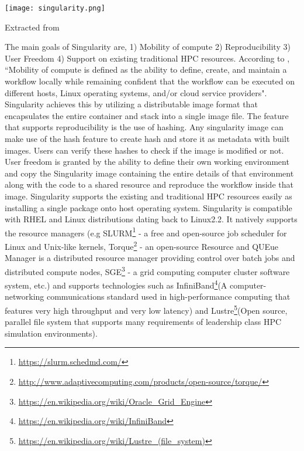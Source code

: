 \begin{center}
\texttt{[image: singularity.png]}
\label{fig:singularity_workflow}
\caption*{Extracted from \cite{10.1371/journal.pone.0177459}}
\end{center}

The main goals of Singularity are, 1) Mobility of compute 2) Reproducibility 3) User Freedom 4) Support on existing traditional HPC resources. According to \cite{10.1371/journal.pone.0177459}, ``Mobility of compute is defined as the ability to define, create, and maintain a workflow locally while remaining confident that the workflow can be executed on different hosts, Linux operating systems, and/or cloud service providers". Singularity achieves this by utilizing a distributable image format that encapsulates the entire container and stack into a single image file. The feature that supports reproducibility is the use of hashing. Any singularity image can make use of the hash feature to create hash and store it as metadata with built images. Users can verify these hashes to check if the image is modified or not. User freedom is granted by the ability to define their own working environment and copy the Singularity image containing the entire details of that environment along with the code to a shared resource and reproduce the workflow inside that image. Singularity supports the existing and traditional HPC resources easily as installing a single package onto host operating system. Singularity is compatible with RHEL and Linux distributions dating back to Linux2.2. It natively supports the resource managers (e.g SLURM\footnote{\url{https://slurm.schedmd.com/}} - a free and open-source job scheduler for Linux and Unix-like kernels, Torque\footnote{\url{http://www.adaptivecomputing.com/products/open-source/torque/}} - an open-source Resource and QUEue Manager is a distributed resource manager providing control over batch jobs and distributed compute nodes, SGE\footnote{\url{https://en.wikipedia.org/wiki/Oracle_Grid_Engine}} - a grid computing computer cluster software system, etc.) and supports technologies such as InfiniBand\footnote{\url{https://en.wikipedia.org/wiki/InfiniBand}}(A computer-networking communications standard used in high-performance computing that features very high throughput and very low latency) and Lustre\footnote{\url{https://en.wikipedia.org/wiki/Lustre_(file_system)}}(Open source, parallel file system that supports many requirements of leadership class HPC simulation environments).

